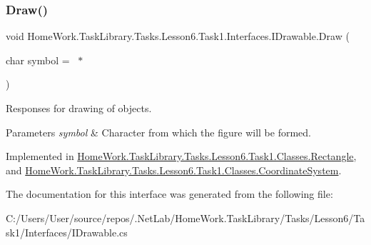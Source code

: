 \subsubsection{\texorpdfstring{Draw()}{Draw()}}
{\footnotesize\ttfamily void Home\+Work.\+Task\+Library.\+Tasks.\+Lesson6.\+Task1.\+Interfaces.\+I\+Drawable.\+Draw (\begin{DoxyParamCaption}\item[{char}]{symbol = {\ttfamily \textquotesingle{}~$\ast$\textquotesingle{}} }\end{DoxyParamCaption})}



Responses for drawing of objects. 


\begin{DoxyParams}{Parameters}
{\em symbol} & Character from which the figure will be formed.\\
\hline
\end{DoxyParams}


Implemented in \mbox{\hyperlink{class_home_work_1_1_task_library_1_1_tasks_1_1_lesson6_1_1_task1_1_1_classes_1_1_rectangle_a8758f1f1f0fe9ba75f859aff3e1e39cf}{Home\+Work.\+Task\+Library.\+Tasks.\+Lesson6.\+Task1.\+Classes.\+Rectangle}}, and \mbox{\hyperlink{class_home_work_1_1_task_library_1_1_tasks_1_1_lesson6_1_1_task1_1_1_classes_1_1_coordinate_system_aec1491abf6151bb7676e57e6ba971182}{Home\+Work.\+Task\+Library.\+Tasks.\+Lesson6.\+Task1.\+Classes.\+Coordinate\+System}}.



The documentation for this interface was generated from the following file\+:\begin{DoxyCompactItemize}
\item 
C\+:/\+Users/\+User/source/repos/.\+Net\+Lab/\+Home\+Work.\+Task\+Library/\+Tasks/\+Lesson6/\+Task1/\+Interfaces/I\+Drawable.\+cs\end{DoxyCompactItemize}
